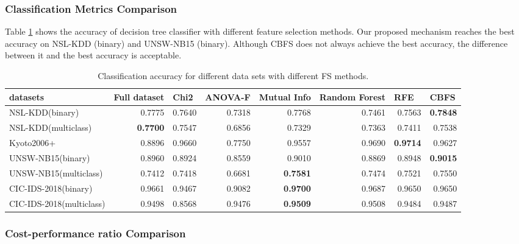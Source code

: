 \documentclass{ieeeaccess}
\theoremstyle{definition}
\begin{document}
\subsubsection{Classification Metrics Comparison}

Table \ref{tab:accuracy} shows the accuracy of decision tree classifier with different feature selection methods. Our proposed mechanism reaches the best accuracy on NSL-KDD (binary) and UNSW-NB15 (binary). Although CBFS does not always achieve the best accuracy, the difference between it and the best accuracy is acceptable.

\begin{table}[htbp]
    \centering
    \caption{Classification accuracy for different data sets with different FS methods.}
    \begin{tabular}{lrrrrrrr}
        \toprule
        datasets & \multicolumn{1}{l}{Full dataset} & \multicolumn{1}{l}{Chi2} & \multicolumn{1}{l}{ANOVA-F} & \multicolumn{1}{l}{Mutual Info} & \multicolumn{1}{l}{Random Forest} & \multicolumn{1}{l}{RFE} & \multicolumn{1}{l}{CBFS} \\
        \midrule
        NSL-KDD(binary) & 0.7775  & 0.7640  & 0.7318  & 0.7768  & 0.7461  & 0.7563  & \textbf{0.7848} \\
        NSL-KDD(multiclass) & \textbf{0.7700} & 0.7547  & 0.6856  & 0.7329  & 0.7363  & 0.7411  & 0.7538  \\
        Kyoto2006+ & 0.8896  & 0.9660  & 0.7750  & 0.9557  & 0.9690  & \textbf{0.9714} & 0.9627  \\
        UNSW-NB15(binary) & 0.8960  & 0.8924  & 0.8559  & 0.9010  & 0.8869  & 0.8948  & \textbf{0.9015} \\
        UNSW-NB15(multiclass) & 0.7412  & 0.7418  & 0.6681  & \textbf{0.7581} & 0.7474  & 0.7521  & 0.7550  \\
        CIC-IDS-2018(binary) & 0.9661  & 0.9467  & 0.9082  & \textbf{0.9700} & 0.9687  & 0.9650  & 0.9650  \\
        CIC-IDS-2018(multiclass) & 0.9498  & 0.8568  & 0.9476  & \textbf{0.9509} & 0.9508  & 0.9484  & 0.9487  \\
        \bottomrule
    \end{tabular}%
    \label{tab:accuracy}%
\end{table}%

\subsubsection{Cost-performance ratio Comparison}
\end{document}
